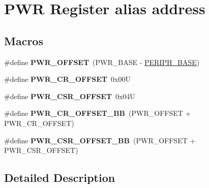 \hypertarget{group___p_w_r__register__alias__address}{}\section{P\+WR Register alias address}
\label{group___p_w_r__register__alias__address}
\subsection*{Macros}
\begin{DoxyCompactItemize}
\item 
\mbox{\label{group___p_w_r__register__alias__address_ga7f88bce73931300319824f22578f90de}} 
\#define {\bfseries P\+W\+R\+\_\+\+O\+F\+F\+S\+ET}~(P\+W\+R\+\_\+\+B\+A\+SE -\/ \mbox{\hyperlink{group___peripheral__memory__map_ga9171f49478fa86d932f89e78e73b88b0}{P\+E\+R\+I\+P\+H\+\_\+\+B\+A\+SE}})
\item 
\mbox{\label{group___p_w_r__register__alias__address_gafc4a9746ee5df183f01c6c9b2b193bf8}} 
\#define {\bfseries P\+W\+R\+\_\+\+C\+R\+\_\+\+O\+F\+F\+S\+ET}~0x00U
\item 
\mbox{\label{group___p_w_r__register__alias__address_ga5108a7917314663531d70bdf05ea2698}} 
\#define {\bfseries P\+W\+R\+\_\+\+C\+S\+R\+\_\+\+O\+F\+F\+S\+ET}~0x04U
\item 
\mbox{\label{group___p_w_r__register__alias__address_ga387e4e883d6bea5c2223adc42ee72daa}} 
\#define {\bfseries P\+W\+R\+\_\+\+C\+R\+\_\+\+O\+F\+F\+S\+E\+T\+\_\+\+BB}~(P\+W\+R\+\_\+\+O\+F\+F\+S\+ET + P\+W\+R\+\_\+\+C\+R\+\_\+\+O\+F\+F\+S\+ET)
\item 
\mbox{\label{group___p_w_r__register__alias__address_gaa9477acfcacc4610533df164c94ad6fd}} 
\#define {\bfseries P\+W\+R\+\_\+\+C\+S\+R\+\_\+\+O\+F\+F\+S\+E\+T\+\_\+\+BB}~(P\+W\+R\+\_\+\+O\+F\+F\+S\+ET + P\+W\+R\+\_\+\+C\+S\+R\+\_\+\+O\+F\+F\+S\+ET)
\end{DoxyCompactItemize}


\subsection{Detailed Description}

